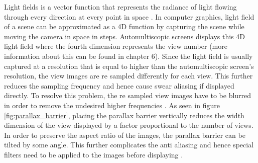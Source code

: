 Light fields is a vector function that represents the radiance of light flowing through every direction at every point in space \cite{ wiki:Light_field}. In computer graphics, light field of a scene can be approximated as a 4D function by capturing the scene while moving the camera in space in steps. Automultiscopic screens displays this 4D light field where the fourth dimension represents the view number (more information about this can be found in chapter 6). Since the light field is usually captured at a resolution that is equal to higher than the automultiscopic screen's resolution, the view images are re sampled differently for each view. This further reduces the sampling frequency and hence cause swear aliasing if displayed directly. To resolve this problem, the re sampled view images have to be blurred in order to remove the undesired higher frequencies \cite{zwicker2006antialiasing}. As seen in figure \ref{fig:parallax_barrier}, placing the parallax barrier vertically reduces the width dimension of the view displayed by a factor proportional to the number of views. In order to preserve the aspect ratio of the images, the parallax barrier can be tilted by some angle. This further complicates the anti aliasing and hence special filters need to be applied to the images before displaying \cite{boev2007crosstalk}.
